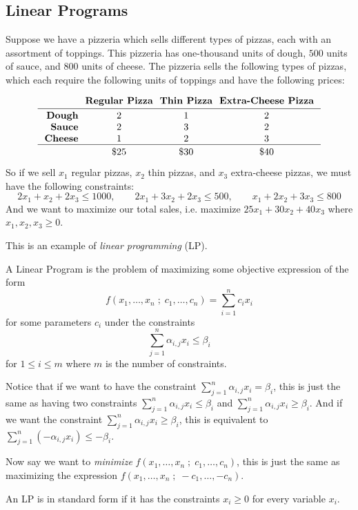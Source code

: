 \subsection{Linear Programs}

Suppose we have a pizzeria which sells different types of pizzas, each with an assortment of toppings.
This pizzeria has one-thousand units of dough, $500$ units of sauce, and $800$ units of cheese.
The pizzeria sells the following types of pizzas, which each require the following units of toppings and have the following prices:

$$ \vbox{\tabskip=.25cm\halign{\hfil\bf#&&\hfil#\hfil\cr
&\bf Regular Pizza&\bf Thin Pizza&\bf Extra-Cheese Pizza\cr\noalign{\kern3pt\hrule\kern3pt}
Dough&2&1&2\cr
Sauce&2&3&2\cr
Cheese&1&2&3\cr\noalign{\kern3pt\hrule\kern3pt}
&\$25&\$30&\$40\cr}} $$

So if we sell $x_1$ regular pizzas, $x_2$ thin pizzas, and $x_3$ extra-cheese pizzas, we must have the following constraints:
$$ 2x_1 + x_2 + 2x_3 \leq 1000,\qquad 2x_1 + 3x_2 + 2x_3 \leq 500,\qquad x_1 + 2x_2 + 3x_3 \leq 800 $$
And we want to maximize our total sales, i.e. maximize $25x_1+30x_2+40x_3$ where $x_1,x_2,x_3\geq0$.

This is an example of {\it linear programming} (LP).

\bdefn

    A {\emphcolor Linear Program} is the problem of maximizing some objective expression of the form
    $$ f(x_1,\dots,x_n\;;\;c_1,\dots,c_n)=\sum_{i=1}^nc_ix_i $$
    for some parameters $c_i$ under the constraints
    $$ \sum_{j=1}^n\alpha_{i,j}x_i\leq\beta_i $$
    for $1\leq i\leq m$ where $m$ is the number of constraints.

\edefn

Notice that if we want to have the constraint $\sum_{j=1}^n\alpha_{i,j}x_i=\beta_i$, this is just the same as having two constraints $\sum_{j=1}^n\alpha_{i,j}x_i\leq\beta_i$ and
$\sum_{j=1}^n\alpha_{i,j}x_i\geq\beta_i$.
And if we want the constraint $\sum_{j=1}^n\alpha_{i,j}x_i\geq\beta_i$, this is equivalent to $\sum_{j=1}^n(-\alpha_{i,j}x_i)\leq-\beta_i$.

Now say we want to {\it minimize} $f(x_1,\dots,x_n\;;\;c_1,\dots,c_n)$, this is just the same as maximizing the expression $f(x_1,\dots,x_n\;;\;-c_1,\dots,-c_n)$.

\bdefn

    An LP is in {\emphcolor standard form} if it has the constraints $x_i\geq0$ for every variable $x_i$.

